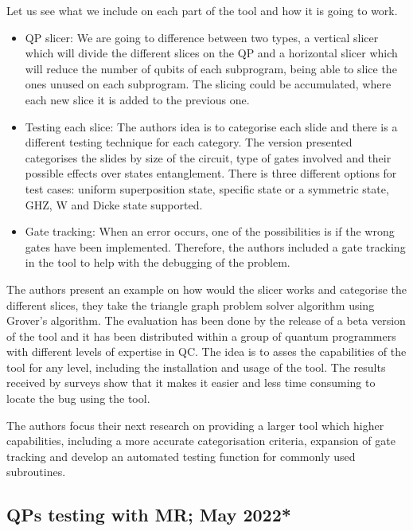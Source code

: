 \begin{itemize}
Let us see what we include on each part of the tool and how it is going to work.
\begin{itemize}
    \item QP slicer: We are going to difference between two types, a vertical slicer which will divide the different slices on the QP and a horizontal slicer which will reduce the number of qubits of each subprogram, being able to slice the ones unused on each subprogram. The slicing could be accumulated, where each new slice it is added to the previous one.
    \item Testing each slice: The authors idea is to categorise each slide and there is a different testing technique for each category. The version presented categorises the slides by size of the circuit, type of gates involved and their possible effects over states entanglement. There is three different options for test cases: uniform superposition state, specific state or a symmetric state, GHZ, W and Dicke state supported.
    \item Gate tracking: When an error occurs, one of the possibilities is if the wrong gates have been implemented. Therefore, the authors included a gate tracking in the tool to help with the debugging of the problem.
\end{itemize}

The authors present an example on how would the slicer works and categorise the different slices, they take the triangle graph problem solver algorithm using Grover's algorithm. The evaluation has been done by the release of a beta version of the tool and it has been distributed within a group of quantum programmers with different levels of expertise in QC. The idea is to asses the capabilities of the tool for any level, including the installation and usage of the tool. The results received by surveys show that it makes it easier and less time consuming to locate the bug using the tool.\newline

The authors focus their next research on providing a larger tool which higher capabilities, including a more accurate categorisation criteria, expansion of gate tracking and develop an automated testing function for commonly used subroutines.

\vspace{15pt}
\subsection{QPs testing with MR; May 2022*}


\end{itemize}

